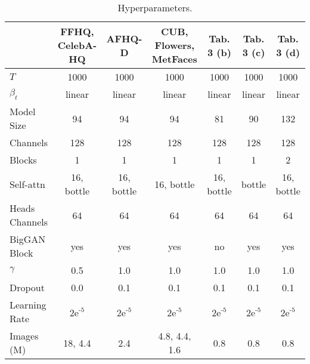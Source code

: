 \begin{table*}[]
\centering
\begin{tabular}{lcccccc}
\hline
               & FFHQ, CelebA-HQ         & AFHQ-D                  & CUB, Flowers, MetFaces  & Tab. 3 (b)              & Tab. 3 (c)              & Tab. 3 (d)              \\ \hline
$T$            & 1000                    & 1000                    & 1000                    & 1000                    & 1000                    & 1000                    \\
$\beta_t$      & linear                  & linear                  & linear                  & linear                  & linear                  & linear                  \\
Model Size     & 94                      & 94                      & 94                      & 81                      & 90                      & 132                     \\
Channels       & 128                     & 128                     & 128                     & 128                     & 128                     & 128                     \\
Blocks         & 1                       & 1                       & 1                       & 1                       & 1                       & 2                       \\
Self-attn      & 16, bottle              & 16, bottle              & 16, bottle              & 16, bottle              & bottle                  & 16, bottle              \\
Heads Channels & 64                      & 64                      & 64                      & 64                      & 64                      & 64                      \\
BigGAN Block   & yes                     & yes                     & yes                     & no                      & yes                     & yes                     \\
$\gamma$       & 0.5                     & 1.0                     & 1.0                     & 1.0                     & 1.0                     & 1.0                     \\
Dropout        & 0.0                     & 0.1                     & 0.1                     & 0.1                     & 0.1                     & 0.1                     \\
Learning Rate  & $\text{2e}^{\text{-5}}$ & $\text{2e}^{\text{-5}}$ & $\text{2e}^{\text{-5}}$ & $\text{2e}^{\text{-5}}$ & $\text{2e}^{\text{-5}}$ & $\text{2e}^{\text{-5}}$ \\
Images (M)     & 18, 4.4               & 2.4                     & 4.8, 4.4, 1.6           & 0.8                     & 0.8                     & 0.8                     \\ \hline
\end{tabular}
\caption{Hyperparameters.}
\vspace{6.5em}
\label{table:config}
\end{table*}